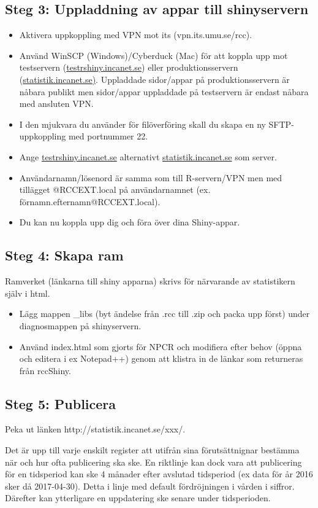 \documentclass[12pt, a4paper,twoside]{report}
\begin{document}
\subsection{Steg 3: Uppladdning av appar till shinyservern}
\begin{itemize}
\item Aktivera uppkoppling med VPN mot its (vpn.its.umu.se/rcc).
\item Använd WinSCP (Windows)/Cyberduck (Mac) för att koppla upp mot testservern (\url{testrshiny.incanet.se}) eller produktionsservern (\url{statistik.incanet.se)}. Uppladdade sidor/appar på produktionsservern är nåbara publikt men sidor/appar uppladdade på testservern är endast nåbara med ansluten VPN.
\item I den mjukvara du använder för filöverföring skall du skapa en ny SFTP-uppkoppling med portnummer 22.
\item Ange \url{testrshiny.incanet.se} alternativt \url{statistik.incanet.se} som server.
\item Användarnamn/lösenord är samma som till R-servern/VPN men med tillägget @RCCEXT.local på användarnamnet (ex. förnamn.efternamn@RCCEXT.local).
\item Du kan nu koppla upp dig och föra över dina Shiny-appar.
\end{itemize}
\subsection{Steg 4: Skapa ram}
Ramverket (länkarna till shiny apparna) skrivs för närvarande av statistikern själv i html.
\begin{itemize}
\item Lägg mappen \_libs (byt ändelse från .rcc till .zip och packa upp först) under diagnosmappen på shinyservern.
\item Använd index.html som gjorts för NPCR och modifiera efter behov (öppna och editera i ex Notepad++) genom att klistra in de länkar som returneras från rccShiny.
\end{itemize}
\subsection{Steg 5: Publicera}
Peka ut länken http://statistik.incanet.se/xxx/.

Det är upp till varje enskilt register att utifrån sina förutsättnignar bestämma när och hur ofta publicering ska ske. En riktlinje kan dock vara att publicering för en tidsperiod kan ske 4 månader efter avslutad tidsperiod (ex data för år 2016 sker då 2017-04-30). Detta i linje med default fördröjningen i vården i siffror. Därefter kan ytterligare en uppdatering ske senare under tidsperioden.
\end{document}
